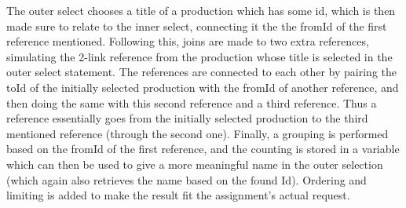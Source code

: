 The outer select chooses a title of a production which has some id, which is then made sure to relate to the inner select, connecting it the the fromId of the first reference mentioned. Following this, joins are made to two extra references, simulating the 2-link reference from the production whose title is selected in the outer select statement. The references are connected to each other by pairing the toId of the initially selected production with the fromId of another reference, and then doing the same with this second reference and a third reference. Thus a reference essentially goes from the initially selected production to the third mentioned reference (through the second one). Finally, a grouping is performed based on the fromId of the first reference, and the counting is stored in a variable which can then be used to give a more meaningful name in the outer selection (which again also retrieves the name based on the found Id). Ordering and limiting is added to make the result fit the assignment's actual request.